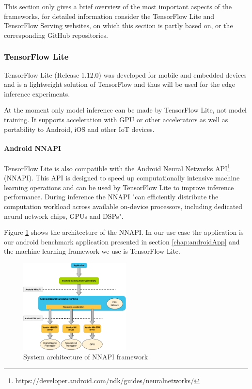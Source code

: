 This section only gives a brief overview of the most important aspects of the frameworks, for detailed information consider the TensorFlow Lite \cite{tfLite}  and TensorFlow Serving \cite{tfServing} websites, on which this section is partly based on, or the corresponding GitHub repositories.
\subsubsection{TensorFlow Lite}
\label{chap:TFLite}
TensorFlow Lite (Release 1.12.0) was developed for mobile and embedded devices and is a lightweight solution of TensorFlow and thus will be used for the edge inference experiments.

At the moment only model inference can be made by TensorFlow Lite, not model training.
It supports acceleration with GPU or other accelerators as well as portability to Android, iOS and other IoT devices.

\paragraph{Android NNAPI}
\label{chap:NNAPI}
TensorFlow Lite is also compatible with the Android Neural Networks API\footnote{https://developer.android.com/ndk/guides/neuralnetworks/} (NNAPI). This API
is designed to speed up computationally intensive machine learning operations and can be used by TensorFlow Lite to improve inference performance. During inference the NNAPI "can
efficiently distribute the computation workload across available on-device processors, including dedicated neural network chips, GPUs and DSPs"\cite{DBLP:journals/corr/abs-1810-01109}.

Figure \ref{fig:NNAPIarchitecture} shows the architecture of the NNAPI. In our use case the application is our android benchmark application presented in section \ref{chap:androidApp} and the machine learning framework we use is TensorFlow Lite.
\begin{figure}[!htb]
\centering
\includegraphics[width=0.5\textwidth]{./Bilder/nnapi_architecture.png}
\caption{System architecture of NNAPI framework \cite{NNAPI}}
\label{fig:NNAPIarchitecture}
\end{figure}


